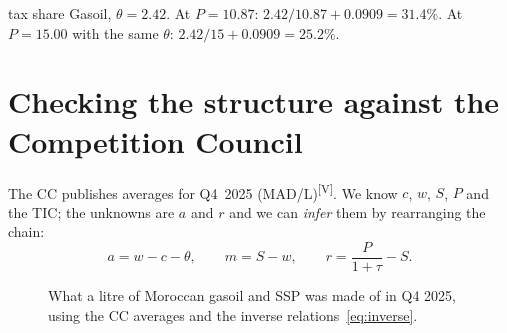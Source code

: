 \documentclass[11pt,a4paper]{article}
\newcommand{\tagV}{\textsuperscript{\textcolor{green!50!black}{\textsf{\scriptsize[V]}}}}
\newcommand{\tagS}{\textsuperscript{\textcolor{orange!80!black}{\textsf{\scriptsize[S]}}}}
\theoremstyle{definition}
\begin{document}
\begin{worked}{tax share}
Gasoil, $\theta=2.42$. At $P=10.87$: $2.42/10.87 + 0.0909 = 31.4\%$. At $P=15.00$ with the same $\theta$:
$2.42/15 + 0.0909 = 25.2\%$.
\end{worked}

\section{Checking the structure against the Competition Council}

The CC publishes averages for Q4~2025 (MAD/L)\tagV. We know $c$, $w$, $S$, $P$ and the TIC; the unknowns are
$a$ and $r$ and we can \emph{infer} them by rearranging the chain:
\begin{equation}\label{eq:inverse}
a = w - c - \theta,\qquad m = S - w,\qquad r = \frac{P}{1+\tau} - S .
\end{equation}

\begin{table}[h]
\centering

\caption{Competition Council Q4 2025 averages (rows above the rule) and what they imply
(rows below). TIC from press reports\tagS. The CC's own weighted gross margin differs slightly from the
simple difference of two averages because it is averaged across firms and periods.}
\label{tab:cc}
\end{table}

\begin{figure}[h]
\centering
{}
\caption{What a litre of Moroccan gasoil and SSP was made of in Q4 2025, using the CC averages and the inverse
relations~\eqref{eq:inverse}.}
\label{fig:stack}
\end{figure}
\end{document}
